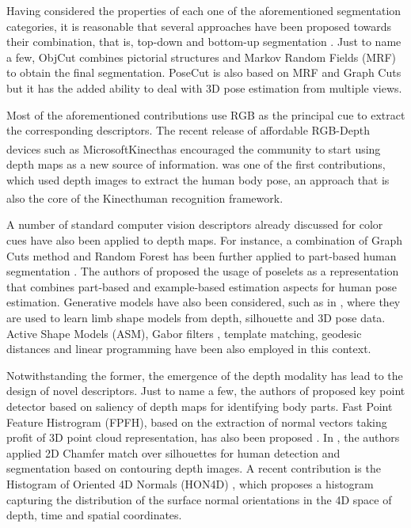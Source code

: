 \documentclass[10pt,twocolumn,letterpaper]{article}
\begin{document}
Having considered the properties of each one of the aforementioned segmentation categories, it is reasonable that several approaches have been proposed towards their combination, that is, top-down and bottom-up segmentation \cite{lin2007interactive, mori2004recovering, ladicky2010and, levin2006learning, fidler2013bottom}. Just to name a few, ObjCut \cite{kumar2005obj} combines pictorial structures and Markov Random Fields (MRF) to obtain the final segmentation. PoseCut \cite{bray2006posecut} is also based on MRF and Graph Cuts but it has the added ability to deal with 3D pose estimation from multiple views.
 
 Most of the aforementioned contributions use RGB as the principal cue to extract the corresponding descriptors. The recent release of affordable RGB-Depth devices such as Microsoft\textsuperscript\textregistered Kinect\textsuperscript\texttrademark has encouraged the community to start using depth maps as a new source of information. \cite{shotton2011depth} was one of the first contributions, which used depth images to extract the human body pose, an approach that is also the core of the Kinect\textsuperscript \texttrademark human recognition framework. 
 
 A number of standard computer vision descriptors already discussed for color cues have also been applied to depth maps. For instance, a combination of Graph Cuts method and Random Forest has been further applied to part-based human segmentation  \cite{hernandez2012graph}. The authors of \cite{holt2011putting} proposed the usage of poselets as a representation that combines part-based and example-based estimation aspects for human pose estimation. Generative models have also been considered, such as in \cite{charles2011learning}, where they are used to learn limb shape models from depth, silhouette and 3D pose data. Active Shape Models (ASM), Gabor filters \cite{pugeault2011spelling}, template matching, geodesic distances \cite{schwarz2011estimating} and linear programming \cite{windheuser2011geometrically} have been also employed in this context.
 
Notwithstanding the former, the emergence of the depth modality has lead to the design of novel descriptors. Just to name a few, the authors of \cite{plagemann2010real} proposed key point detector based on saliency of depth maps for identifying body parts. Fast Point Feature Histrogram (FPFH), based on the extraction of normal vectors taking profit of 3D point cloud representation, has also been proposed \cite{rusu2009fast, rusu20113d, mogelmosetri}. In \cite{xia2011human}, the authors applied 2D Chamfer match over silhouettes for human detection and segmentation based on contouring depth images. A recent contribution is the Histogram of Oriented 4D Normals (HON4D) \cite{oreifej2013hon4d}, which proposes a histogram capturing the distribution of the surface normal orientations in the 4D space of depth, time and spatial coordinates.
 
\end{document}
